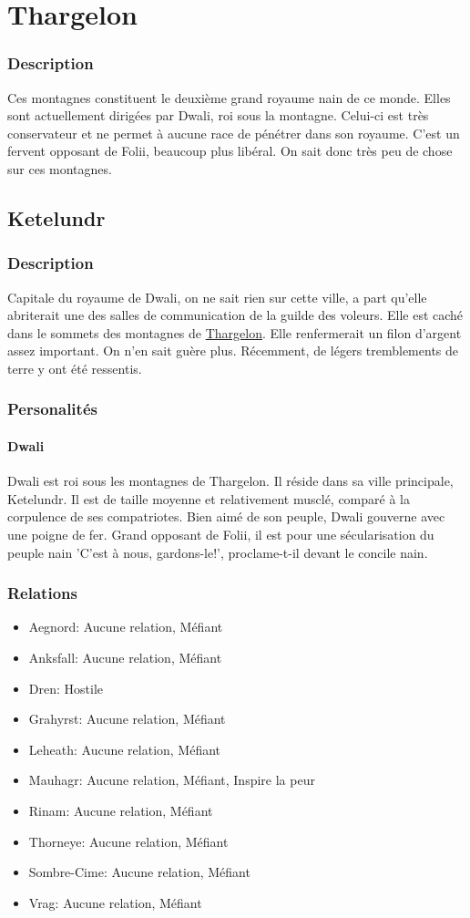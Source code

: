 \section{Thargelon}
\subsubsection{Description}
\hypertarget {thargelon}{}Ces montagnes constituent le deuxième grand royaume nain de ce monde. 
Elles sont actuellement dirigées par Dwali, roi sous la montagne.
Celui-ci est très conservateur et ne permet à aucune race de pénétrer dans son royaume.
C'est un fervent opposant de Folii, beaucoup plus libéral. 
On sait donc très peu de chose sur ces montagnes.
\subsection{Ketelundr}
\subsubsection{Description}
\hypertarget {ketelundr}{}Capitale du royaume de Dwali, on ne sait rien sur cette ville,
a part qu'elle abriterait une des salles de communication de la guilde des voleurs.
Elle est caché dans le sommets des montagnes de \hyperlink {thargelon}{Thargelon}.
Elle renfermerait un filon d'argent assez important. On n'en sait guère plus.
Récemment, de légers tremblements de terre y ont été ressentis.
\subsubsection{Personalités}
\paragraph{Dwali}
\hypertarget{dwali}{}Dwali est roi sous les montagnes de Thargelon. Il réside dans sa ville principale, Ketelundr.
Il est de taille moyenne et relativement musclé, comparé à la corpulence de ses compatriotes.
Bien aimé de son peuple, Dwali gouverne avec une poigne de fer. 
Grand opposant de Folii, il est pour une sécularisation du peuple nain 'C'est à nous, gardons-le!', proclame-t-il devant le concile nain.
\subsubsection{Relations}
\begin{itemize}
\item Aegnord: Aucune relation, Méfiant  
\item Anksfall: Aucune relation, Méfiant 
\item Dren: Hostile    
\item Grahyrst: Aucune relation, Méfiant 
\item Leheath: Aucune relation, Méfiant 
\item Mauhagr: Aucune relation, Méfiant, Inspire la peur  
\item Rinam: Aucune relation, Méfiant 
\item Thorneye: Aucune relation, Méfiant 
\item Sombre-Cime: Aucune relation, Méfiant 
\item Vrag: Aucune relation, Méfiant  
\end{itemize}

